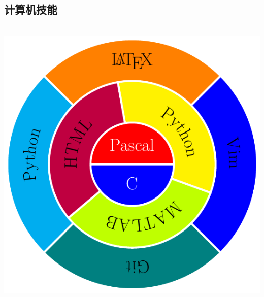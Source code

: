 \documentclass[]{friggeri-cv}
\begin{document}
\begin{aside}
\section{\cuti 计算机技能}
    ~
    \includegraphics[scale=0.42]{img/programming.pdf}
    ~

\end{aside}
\end{document}
